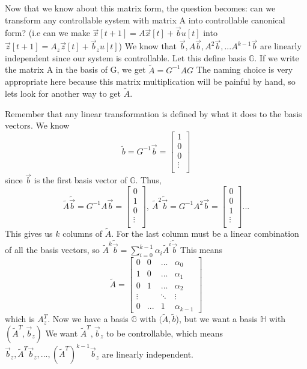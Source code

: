 \documentclass{article}
\begin{document}
Now that we know about this matrix form, the question becomes: can we transform any controllable system with matrix A into controllable canonical form?
(i.e can we make $\vec{x}[t+1]=A\vec{x}[t]+\vec{b}u[t]$ into $\vec{z}[t+1]=A_z\vec{z}[t]+\vec{b}_zu[t]$)
We know that $\vec{b}, A\vec{b}, A^2\vec{b}, ... A^{k-1}\vec{b}$ are linearly independent since our system is controllable. Let this define basis $\mathbb{G}$. If we write the matrix A in the basis of G, we get $\tilde{A}=G^{-1}AG$
The naming choice is very appropriate here because this matrix multiplication will be painful by hand, so lets look for another way to get $\tilde{A}$.

Remember that any linear transformation is defined by what it does to the basis vectors. We know
\[
    \tilde{b} = G^{-1}\vec{b} = \left[
        \begin{array}{c}
            1\\
            0\\
            0\\
            \vdots\\
        \end{array}
    \right]
\]
since $\vec{b}$ is the first basis vector of $\mathbb{G}$. Thus,
\[
    \tilde{A}\tilde{\vec{b}}=G^{-1}A\vec{b} = \left[
        \begin{array}{c}
            0\\
            1\\
            0\\
            \vdots\\
        \end{array}
    \right],\>
    \tilde{A}^2\tilde{\vec{b}} = G^{-1}A^2\vec{b} = \left[
        \begin{array}{c}
            0\\
            0\\
            1\\
            \vdots\\
        \end{array}
    \right] ...
\]
This gives us $k$ columns of $\tilde{A}$. For the last column must be a linear combination of all the basis vectors, so $\tilde{A}^k\tilde{\vec{b}}=\sum_{i=0}^{k-1}{\alpha_i\tilde{A}^i\tilde{\vec{b}}}$
This means
\[
    \tilde{A} = \left[
        \begin{array}{cccc}
            0 & 0 & ... & \alpha_0\\
            1 & 0 & ... & \alpha_1\\
            0 & 1 & ... & \alpha_2\\
            \vdots & & \ddots & \vdots\\
            0 & ... & 1 & \alpha_{k-1}
        \end{array}
    \right]
    \]
which is $A_z^T$. Now we have a basis $\mathbb{G}$ with $(\tilde{A}, \tilde{b}$), but we want a basis $\mathbb{H}$ with $(\tilde{A}^T, \vec{b}_z)$
We want $\tilde{A}^T, \vec{b}_z$ to be controllable, which means $\vec{b}_z, \tilde{A}^T\vec{b}_z,...,(\tilde{A}^T)^{k-1}\vec{b}_z$ are linearly independent.
\end{document}
